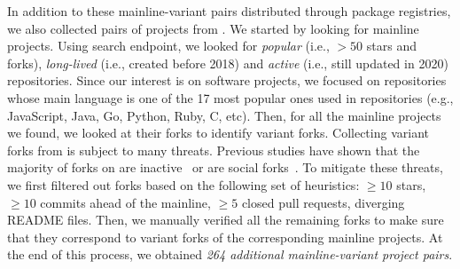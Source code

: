 In addition to these mainline-variant pairs distributed through package registries, we also collected pairs of projects from \gh.
We started by looking for mainline projects.
Using \gh search endpoint, we looked for \emph{popular} (i.e., $>50$ stars and forks), \emph{long-lived} (i.e., created before 2018) and \emph{active} (i.e., still updated in 2020) repositories. Since our interest is on software projects, we focused on repositories whose main language is one of the 17 most popular ones used in \gh repositories (e.g., \textsf{JavaScript, Java, Go, Python, Ruby, C}, etc). 
Then, for all the mainline projects we found, we looked at their forks to identify variant forks. Collecting variant forks from \gh is subject to many threats. Previous studies have shown that the majority of forks on \gh are inactive~\cite{Businge:Android:2019,Businge:2017} or are social forks~\cite{businge:2018icsme}.
To mitigate these threats, we first filtered out forks based on  the following set of heuristics: $\geq 10$ stars, $\geq 10$ commits ahead of the mainline, $\geq 5$ closed pull requests, diverging \textsf{README} files.
Then, we manually verified all the remaining forks to make sure that they correspond to variant forks of the corresponding mainline projects.
At the end of this process, we obtained \textit{264 additional mainline-variant project pairs}.

